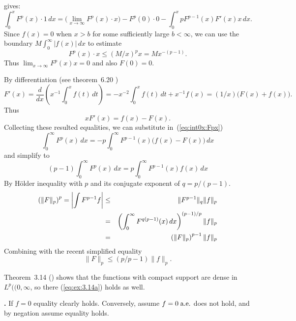 \begin{enumerate}
gives:
\begin{equation} \label{eq:int0x:Fpx}
 \int_0^x F^p(x)\cdot 1\,dx
 = \bigl(\lim_{x\to\infty} F^p(x)\cdot x\bigr) - F^p(0)\cdot 0
   - \int_0^x pF^{p-1}(x)F'(x)x\,dx .
\end{equation}
Since \(f(x)=0\) when \(x>b\) for some sufficiently large \(b<\infty\),
we can use the boundary  \(M\int_0^\infty |f(x)|\,dx\) to estimate
\begin{equation*}
 F^p(x)\cdot x
 \leq (M/x)^p x = Mx^{-(p-1)}.
\end{equation*}
Thus \(\lim_{x\to\infty} F^p(x)x = 0\) and also \(F(0) = 0\).

By differentiation (see theorem~6.20 \cite{RudinPMA85})
\begin{equation*}
F'(x)
 = \frac{d}{dx}\left(x^{-1}\int_0^x f(t)\,dt\right)
 = -x^{-2}\int_0^x f(t)\,dt + x^{-1}f(x) = (1/x)\bigl(F(x) + f(x)\bigr).
\end{equation*}
Thus
\begin{equation}  \label{eq:ex14:xF}
xF'(x) = f(x) - F(x).
\end{equation}
Collecting these resulted equalities,
we can substitute in~(\ref{eq:int0x:Fpx})
\begin{equation*}
 \int_0^\infty F^p(x)\,dx
  =  - p \int_0^\infty F^{p-1}(x)\bigl(f(x) - F(x)\bigr)\,dx
\end{equation*}
and simplify to
\begin{equation*}
(p-1) \int_0^\infty F^p(x)\,dx =  p \int_0^\infty F^{p-1}(x)f(x)\,dx
\end{equation*}
By H\"older inequality with $p$ and its conjugate exponent of \(q=p/(p-1)\).
\begin{eqnarray}
 \left(\|F\|_p\right)^p
    = \left|\int F^{p-1}f\right| \notag
 &\leq& \|F^{p-1}\|_q \|f\|_p    \label{eq:ex14:a} \\
 &=& \left(\int_0^\infty F^{q(p-1)}(x)\,dx\right)^{(p-1)/p} \|f\|_p \notag \\
 &=& \left(\|F\|_p\right)^{p-1} \|f\|_p \notag
\end{eqnarray}
Combining with the recent simplified equality
\begin{equation} \label{eq:ex:3.14a}
 \|F\|_p \leq (p/p-1) \|f\|_p.
\end{equation}

Theorem~3.14 (\cite{RudinRCA80}) shows that the functions with compact support
are dense in \(L^p((0,\infty\), so there (\ref{eq:ex:3.14a})
holds as well.

\textbf{.}
If \(f=0\) equality clearly holds. Conversely, assume \(f=0\; \textrm{a.e.}\)
does not hold, and by negation assume equality holds.


\end{enumerate}
